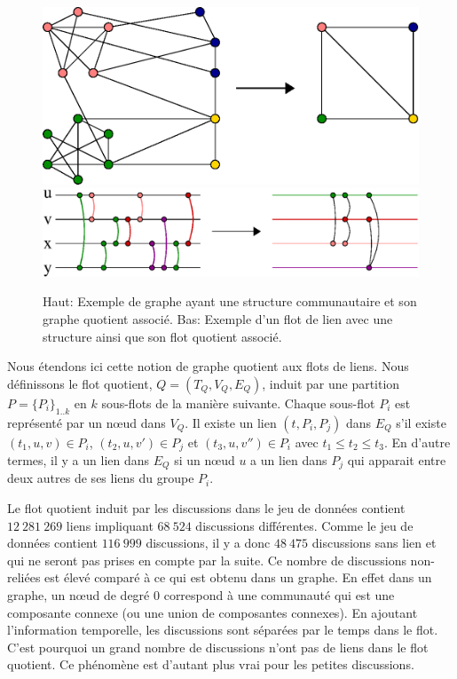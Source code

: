 \begin{figure}
\centering
	\includegraphics[width=0.50\linewidth]{img/mailing/graph-quotient}
	\vfill
	\includegraphics[width=0.75\linewidth]{img/mailing/stream-quotient}
	\caption{Haut: Exemple de graphe ayant une structure communautaire et son graphe quotient associé. Bas: Exemple d'un flot de lien avec une structure ainsi que son flot quotient associé.}
	\label{fig:graph-quotient}
\end{figure}

Nous étendons ici cette notion de graphe quotient aux flots de liens.
Nous définissons le flot quotient, $Q=(T_Q,V_Q,E_Q)$, induit par une partition $P=\{{P_i}\}_{1..k}$ en $k$ sous-flots de la manière suivante.
Chaque sous-flot $P_i$ est représenté par un n\oe ud dans $V_Q$.
Il existe un lien $(t,P_i,P_j)$ dans $E_Q$ s'il existe $(t_1,u,v) \in P_i$, $(t_2,u,v') \in P_j$ et $(t_3,u,v'') \in P_i$ avec $t_1 \leq t_2 \leq t_3$.
En d'autre termes, il y a un lien dans $E_Q$ si un n\oe ud $u$ a un lien dans $P_j$ qui apparait entre deux autres de ses liens du groupe $P_i$.

Le flot quotient induit par les discussions dans le jeu de données contient $12\ 281\ 269$ liens impliquant $68\ 524$ discussions différentes.
Comme le jeu de données contient $116\ 999$ discussions, il y a donc $48\ 475$ discussions sans lien et qui ne seront pas prises en compte par la suite.
Ce nombre de discussions non-reliées est élevé comparé à ce qui est obtenu dans un graphe.
En effet dans un graphe, un n\oe ud de degré $0$ correspond à une communauté qui est une composante connexe (ou une union de composantes connexes).
En ajoutant l'information temporelle, les discussions sont séparées par le temps dans le flot.
C'est pourquoi un grand nombre de discussions n'ont pas de liens dans le flot quotient.
Ce phénomène est d'autant plus vrai pour les petites discussions.



